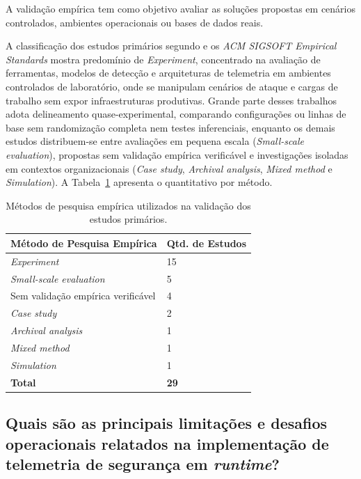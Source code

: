 A validação empírica tem como objetivo avaliar as soluções propostas em cenários controlados, ambientes operacionais ou bases de dados reais.

A classificação dos estudos primários segundo  e os \textit{ACM SIGSOFT Empirical Standards} mostra predomínio de \textit{Experiment}, concentrado na avaliação de ferramentas, modelos de detecção e arquiteturas de telemetria em ambientes controlados de laboratório, onde se manipulam cenários de ataque e cargas de trabalho sem expor infraestruturas produtivas. Grande parte desses trabalhos adota delineamento quase-experimental, comparando configurações ou linhas de base sem randomização completa nem testes inferenciais, enquanto os demais estudos distribuem-se entre avaliações em pequena escala (\textit{Small-scale evaluation}), propostas sem validação empírica verificável e investigações isoladas em contextos organizacionais (\textit{Case study}, \textit{Archival analysis}, \textit{Mixed method} e \textit{Simulation}). A Tabela~\ref{tab:rsl_qs10} apresenta o quantitativo por método.

\begin{table}[!htbp]
    \centering
    \caption{Métodos de pesquisa empírica utilizados na validação dos estudos primários.}
    \label{tab:rsl_qs10}
    \footnotesize
    \begin{tabular}{p{10.5cm}p{3.5cm}}
        \hline
        \textbf{Método de Pesquisa Empírica} & \textbf{Qtd. de Estudos} \\ \hline
        \textit{Experiment} & 15 \\ \hline
        \textit{Small-scale evaluation} & 5 \\ \hline
        Sem validação empírica verificável & 4 \\ \hline
        \textit{Case study} & 2 \\ \hline
        \textit{Archival analysis} & 1 \\ \hline
        \textit{Mixed method} & 1 \\ \hline
        \textit{Simulation} & 1 \\ \hline
        \textbf{Total} & \textbf{29} \\ \hline
    \end{tabular}
\end{table}
\FloatBarrier

\subsection{Quais são as principais limitações e desafios operacionais relatados na implementação de telemetria de segurança em \textit{runtime}?}
\label{subsec:rsl_qs11}

